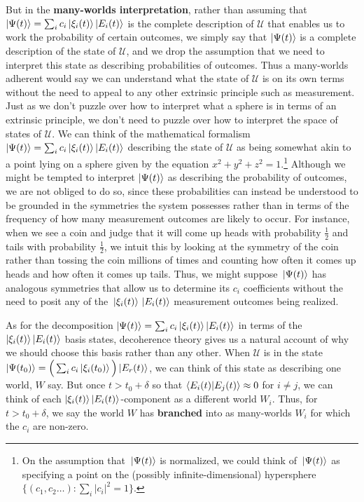     But in the \textbf{many-worlds interpretation}, rather than assuming that $\ket{\Psi(t)}=\sum_i c_i \ket{\xi_i(t)}\ket{E_i(t)}$ is the complete description of $\mathcal{U}$ that enables us to work the probability of certain outcomes, we simply say that $\ket{\Psi(t)}$ is a complete description of the state of $\mathcal{U}$, and we drop the assumption that we need to interpret this state as describing probabilities of outcomes. Thus a many-worlds adherent would say we can understand what the state of $\mathcal{U}$ is on its own terms without the need to appeal to any other extrinsic principle such as measurement. Just as we don't puzzle over how to interpret what a sphere is in terms of an extrinsic principle, we don't need to puzzle over how to interpret the space of states of $\mathcal{U}$. We can think of the mathematical formalism $\ket{\Psi(t)}=\sum_i c_i \ket{\xi_i(t)}\ket{E_i(t)}$ describing the state of $\mathcal{U}$ as being somewhat akin to a point lying on a sphere given by the equation $x^2+y^2+z^2=1$.\footnote{On the assumption that $\ket*{\Psi(t)}$ is normalized, we could think of $\ket*{\Psi(t)}$ as specifying a point on the (possibly infinite-dimensional) hypersphere $\{(c_1,c_2\ldots):\sum_i|c_i|^2=1\}.$} Although we might be tempted to interpret $\ket{\Psi(t)}$ as describing the probability of outcomes, we are not obliged to do so,  since these probabilities can instead be understood to be grounded in the symmetries the system possesses rather than in terms of the frequency of how many measurement outcomes are likely to occur. For instance, when we see a coin and judge that it will come up heads with probability $\frac{1}{2}$ and tails with probability $\frac{1}{2}$, we intuit this by looking at the symmetry of the coin rather than tossing the coin millions of times and counting how often it comes up heads and how often it comes up tails. Thus, we might suppose $\ket*{\Psi(t)}$ has analogous symmetries that allow us to determine its $c_i$ coefficients without the need to posit any of the $\ket*{\xi_i(t)}\ket*{E_i(t)}$ measurement outcomes being realized.
     
    As for the decomposition $\ket{\Psi(t)}=\sum_i c_i \ket{\xi_i(t)}\ket{E_i(t)}$  in terms of the $\ket{\xi_i(t)}\ket{E_i(t)}$ basis states, decoherence theory gives us a natural account of why we should choose this basis rather than any other. When $\mathcal{U}$ is in the state $\ket{\Psi(t_0)}=\Big(\sum_i c_i \ket{\xi_i(t_0)}\Big)\ket{E_r(t)}$, we can think of this state as describing one world, $W$ say.  %
%
    But once $t>t_0+\delta$ so that $\ip{E_i(t)}{E_j(t)}\approx 0$ for $i\neq j$, we can think of each $\ket{\xi_i(t)}\ket{E_i(t)}$-component as a different world $W_i$.   %
%
    Thus, for $t>t_0+\delta$, we say the world $W$ has \textbf{branched} into as many-worlds $W_i$ for which the $c_i$ are non-zero. 
    
